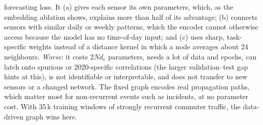 \documentclass[11pt,a4paper]{article}
\begin{document}
\begin{enumerate}
forecasting loss. It (a) gives each sensor its own parameters, which, as the embedding ablation shows, explains more than half of
its advantage; (b) connects sensors with similar daily or weekly patterns, which the encoder cannot otherwise access because the
model has no time-of-day input; and (c) uses sharp, task-specific weights instead of a distance kernel in which a node averages
about 24 neighbours. \emph{Worse}: it costs $2Nd_e$ parameters, needs a lot of data and epochs, can latch onto spurious or
2020-specific correlations (the larger validation--test gap hints at this), is not identifiable or interpretable, and does not
transfer to new sensors or a changed network. The fixed graph encodes real propagation paths, which matter most for
non-recurrent events such as incidents, at no parameter cost. With 35\,k training windows of strongly recurrent commuter traffic,
the data-driven graph wins here.
\end{enumerate}
\end{document}
